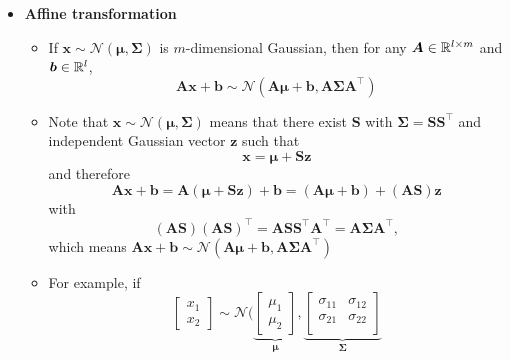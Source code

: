 \documentclass[12pt,a4paper]{article}
\begin{document}
\begin{itemize}
\item \textbf{Affine transformation}
  \begin{itemize}
  \item If $\bm{x}\sim \mathcal{N}(\bm{\mu},\bm{\Sigma})$
    is $m$-dimensional Gaussian,
    then for any $\bm{A}\in \mathbb{R}^{l\times m}$ and $\bm{b}\in \mathbb{R}^{l}$,
    \begin{equation}\nonumber%
      \bm{A}\bm{x} + \bm{b} \sim \mathcal{N}(\bm{A}\bm{\mu} + \bm{b},\bm{A}\bm{\Sigma} \bm{A}^{\top})
    \end{equation}
  \item Note that $\bm{x}\sim \mathcal{N}(\bm{\mu},\bm{\Sigma})$ means that
    there exist $\bm{S}$ with $\bm{\Sigma}=\bm{S}\bm{S}^{\top}$
    and independent Gaussian vector $\bm{z}$ such that
    \begin{equation}\nonumber%
      \bm{x} = \bm{\mu} + \bm{S}\bm{z}
    \end{equation}
    and therefore
    \begin{equation}\nonumber%
      \bm{A}\bm{x} + \bm{b}
      =
      \bm{A}(\bm{\mu} +\bm{S}\bm{z}) + \bm{b}
      =
      (\bm{A}\bm{\mu} + \bm{b}) + (\bm{A}\bm{S})\bm{z}
    \end{equation}
    with
    \begin{equation}\nonumber%
      (\bm{A}\bm{S})(\bm{A}\bm{S})^{\top}
      = \bm{A}\bm{S}\bm{S}^{\top}\bm{A}^{\top}
      = \bm{A}\bm{\Sigma} \bm{A}^{\top},
    \end{equation}
    which means $\bm{A}\bm{x} + \bm{b} \sim \mathcal{N}(\bm{A}\bm{\mu} + \bm{b},\bm{A}\bm{\Sigma} \bm{A}^{\top})$
  \item For example, if
    \begin{equation}\nonumber%
      \begin{bmatrix}
        x_{1} \\ x_{2}
      \end{bmatrix}
      \sim \mathcal{N} \bigg(
      \underbrace{
        \begin{bmatrix}
          \mu_{1} \\ \mu_{2}
        \end{bmatrix}}_{\bm{\mu}},
      \underbrace{
        \begin{bmatrix}
          \sigma_{11} & \sigma_{12} \\
          \sigma_{21} & \sigma_{22} \\
        \end{bmatrix}}_{\bm{\Sigma}}

\end{equation}
\end{itemize}
\end{itemize}
\end{document}
